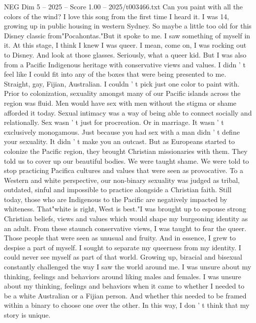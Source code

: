 \begin{textsample}{NEG Dim 5 – 2025 – Score 1.00 – 2025/t003466.txt}  \label{ex:f5_neg_002}
Can you paint with all the colors of the wind?
I love this song from the first time I heard it.
I was 14, growing up in public housing in western Sydney.
So maybe a little too old for this Disney classic from"Pocahontas."But it spoke to me.
I saw something of myself in it.
At this stage, I think I knew I was queer.
I mean, come on, I was rocking out to Disney.
And look at those glasses.
Seriously, what a queer kid.
But I was also from a Pacific Indigenous heritage with conservative views and values.
I didn ' t feel like I could fit into any of the boxes that were being presented to me.
Straight, gay, Fijian, Australian.
I couldn ' t pick just one color to paint with.
Prior to colonization, sexuality amongst many of our Pacific islands across the region was fluid.
Men would have sex with men without the stigma or shame afforded it today.
Sexual intimacy was a way of being able to connect socially and relationally.
Sex wasn ' t just for procreation.
Or in marriage.
It wasn ' t exclusively monogamous.
Just because you had sex with a man didn ' t define your sexuality.
It didn ' t make you an outcast.
But as Europeans started to colonize the Pacific region, they brought Christian missionaries with them.
They told us to cover up our beautiful bodies.
We were taught shame.
We were told to stop practicing Pacifica cultures and values that were seen as provocative.
To a Western and white perspective, our non-binary sexuality was judged as tribal, outdated, sinful and impossible to practice alongside a Christian faith.
Still today, those who are Indigenous to the Pacific are negatively impacted by whiteness.
That"white is right, West is best."I was brought up to espouse strong Christian beliefs, views and values which would shape my burgeoning identity as an adult.
From these staunch conservative views, I was taught to fear the queer.
Those people that were seen as unusual and fruity.
And in essence, I grew to despise a part of myself.
I sought to separate my queerness from my identity.
I could never see myself as part of that world.
Growing up, biracial and bisexual constantly challenged the way I saw the world around me.
I was unsure about my thinking, feelings and behaviors around liking males and females.
I was unsure about my thinking, feelings and behaviors when it came to whether I needed to be a white Australian or a Fijian person.
And whether this needed to be framed within a binary to choose one over the other.
In this way, I don ' t think that my story is unique.

\end{textsample}
